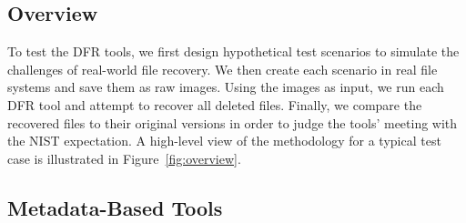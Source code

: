 \documentclass{ws-rv9x6}
\newenvironment{paraphrase}{\color{blue}}{\color{black}} %
\begin{document}
\subsection{Overview}
\begin{paraphrase}
 To test the DFR tools, we first design hypothetical test scenarios to simulate the challenges of real-world file recovery.
We then create each scenario in real file systems and save them as raw images. 
Using the images as input, we run each DFR tool and attempt to recover all deleted files. 
Finally, we compare the recovered files to their original versions in order to judge the tools' 
meeting with the NIST expectation. A high-level view of the methodology for a typical test case is illustrated in Figure~\ref{fig:overview}.

\end{paraphrase}


\subsection{Metadata-Based Tools}
\end{document}
